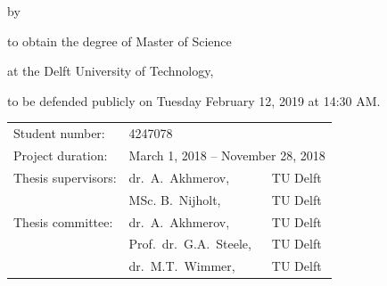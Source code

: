 \begin{titlepage}


\begin{center}


{\makeatletter
\largetitlestyle\fontsize{64}{94}\selectfont\@title
\makeatother}

{\makeatletter
\ifx\@subtitle\undefined\else
    \bigskip
   {\tudsffamily\fontsize{22}{32}\selectfont\@subtitle}    
\fi
\makeatother}

\bigskip
\bigskip

by

\bigskip
\bigskip

{\makeatletter
\largetitlestyle\fontsize{26}{26}\selectfont\@author
\makeatother}

\bigskip
\bigskip

to obtain the degree of Master of Science

at the Delft University of Technology,

to be defended publicly on Tuesday February 12, 2019 at 14:30 AM.

\vfill

\begin{tabular}{lll}
    Student number: & 4247078 \\
    Project duration: & \multicolumn{2}{l}{March 1, 2018 -- November 28, 2018} \\
    Thesis supervisors: & dr.\ A.\ Akhmerov, & TU Delft \\
                        & MSc. B.\ Nijholt, & TU Delft \\
    Thesis committee: & dr.\ A.\ Akhmerov, & TU Delft \\
                      & Prof.\ dr.\ G.A.\ Steele, & TU Delft \\
                      & dr.\ M.T.\ Wimmer, & TU Delft \\
\end{tabular}

\bigskip
\bigskip


\end{center}
\end{titlepage}
